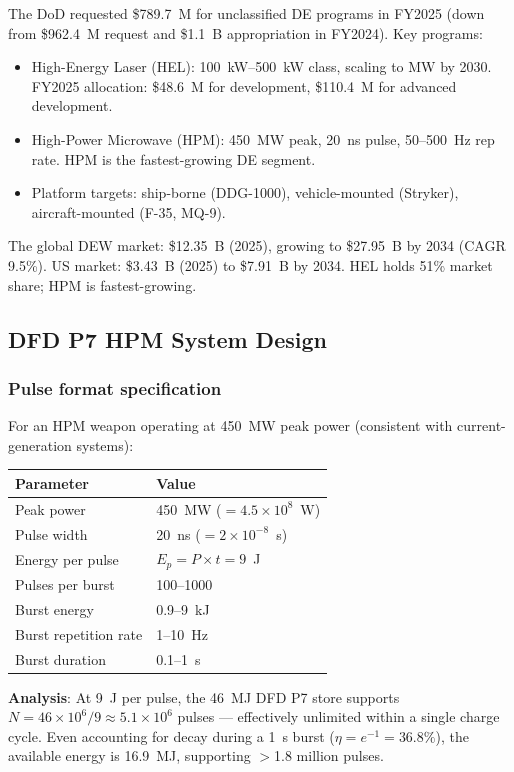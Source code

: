 \documentclass[11pt]{article}
\newcommand{\ee}[1]{\times 10^{#1}}
\begin{document}
The DoD requested \$789.7~M for unclassified DE programs in FY2025 (down
from \$962.4~M request and \$1.1~B appropriation in FY2024). Key programs:
\begin{itemize}[nosep]
  \item High-Energy Laser (HEL): 100~kW--500~kW class, scaling to MW by
    2030. FY2025 allocation: \$48.6~M for development, \$110.4~M for
    advanced development.
  \item High-Power Microwave (HPM): 450~MW peak, 20~ns pulse, 50--500~Hz
    rep rate. HPM is the fastest-growing DE segment.
  \item Platform targets: ship-borne (DDG-1000), vehicle-mounted (Stryker),
    aircraft-mounted (F-35, MQ-9).
\end{itemize}

The global DEW market: \$12.35~B (2025), growing to \$27.95~B by 2034
(CAGR 9.5\%). US market: \$3.43~B (2025) to \$7.91~B by 2034.
HEL holds 51\% market share; HPM is fastest-growing.

\subsection{DFD P7 HPM System Design}

\subsubsection{Pulse format specification}

For an HPM weapon operating at 450~MW peak power (consistent with
current-generation systems):

\begin{center}
\begin{tabular}{ll}
\toprule
Parameter & Value \\
\midrule
Peak power & 450~MW ($= 4.5\ee{8}$~W) \\
Pulse width & 20~ns ($= 2\ee{-8}$~s) \\
Energy per pulse & $E_p = P \times t = 9$~J \\
Pulses per burst & 100--1000 \\
Burst energy & 0.9--9~kJ \\
Burst repetition rate & 1--10~Hz \\
Burst duration & 0.1--1~s \\
\bottomrule
\end{tabular}
\end{center}

\textbf{Analysis}: At 9~J per pulse, the 46~MJ DFD P7 store supports
$N = 46\ee{6}/9 \approx 5.1\ee{6}$ pulses --- effectively unlimited
within a single charge cycle. Even accounting for decay during a 1~s
burst ($\eta = e^{-1} = 36.8\%$), the available energy is 16.9~MJ,
supporting $>$1.8 million pulses.
\end{document}
